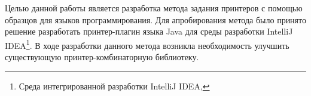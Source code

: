 Целью данной работы является разработка метода задания принтеров с помощью
образцов для языков программирования. 
Для апробирования метода было принято решение разработать принтер-плагин
языка Java для среды разработки IntelliJ IDEA\footnote{Среда интегрированной
разработки IntelliJ IDEA, }.
В ходе разработки данного метода возникла необходимость улучшить существующую
принтер-комбинаторную библиотеку\cite{swierstra}. 


